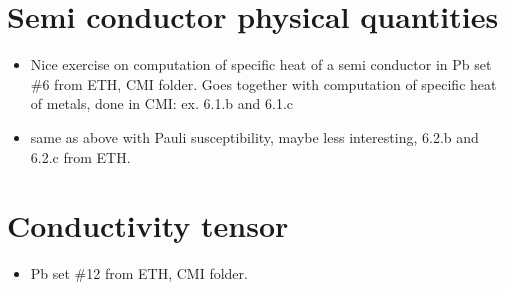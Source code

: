 \section{Semi conductor physical quantities}

\begin{itemize}
\item Nice exercise on computation of specific heat of a semi
  conductor in Pb set \#6 from ETH, CMI folder. Goes together with
  computation of specific heat of metals, done in CMI: ex. 6.1.b and
  6.1.c
\item same as above with Pauli susceptibility, maybe less interesting,
  6.2.b and 6.2.c from ETH.
\end{itemize}

\section{Conductivity tensor}

\begin{itemize}
\item Pb set \#12 from ETH, CMI folder.
\end{itemize}


